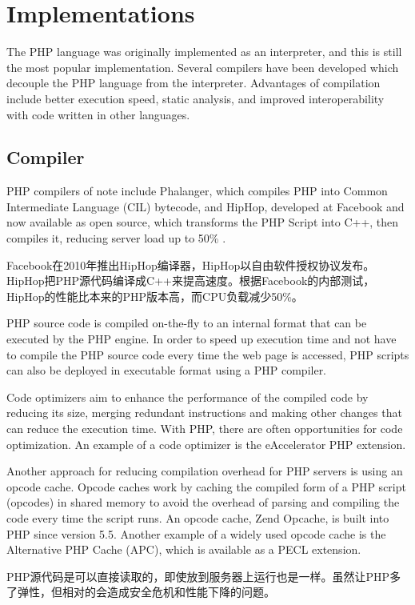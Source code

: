 \chapter{Implementations}


The PHP language was originally implemented as an interpreter, and this is still the most popular implementation. Several compilers have been developed which decouple the PHP language from the interpreter. Advantages of compilation include better execution speed, static analysis, and improved interoperability with code written in other languages.

\section{Compiler}


PHP compilers of note include Phalanger, which compiles PHP into Common Intermediate Language (CIL) bytecode, and HipHop, developed at Facebook and now available as open source, which transforms the PHP Script into C++, then compiles it, reducing server load up to 50\% .

Facebook在2010年推出HipHop编译器，HipHop以自由软件授权协议发布。HipHop把PHP源代码编译成C++来提高速度。根据Facebook的内部测试，HipHop的性能比本来的PHP版本高，而CPU负载减少50\%。

PHP source code is compiled on-the-fly to an internal format that can be executed by the PHP engine. In order to speed up execution time and not have to compile the PHP source code every time the web page is accessed, PHP scripts can also be deployed in executable format using a PHP compiler.


Code optimizers aim to enhance the performance of the compiled code by reducing its size, merging redundant instructions and making other changes that can reduce the execution time. With PHP, there are often opportunities for code optimization. An example of a code optimizer is the eAccelerator PHP extension.

Another approach for reducing compilation overhead for PHP servers is using an opcode cache. Opcode caches work by caching the compiled form of a PHP script (opcodes) in shared memory to avoid the overhead of parsing and compiling the code every time the script runs. An opcode cache, Zend Opcache, is built into PHP since version 5.5. Another example of a widely used opcode cache is the Alternative PHP Cache (APC), which is available as a PECL extension.

PHP源代码是可以直接读取的，即使放到服务器上运行也是一样。虽然让PHP多了弹性，但相对的会造成安全危机和性能下降的问题。

